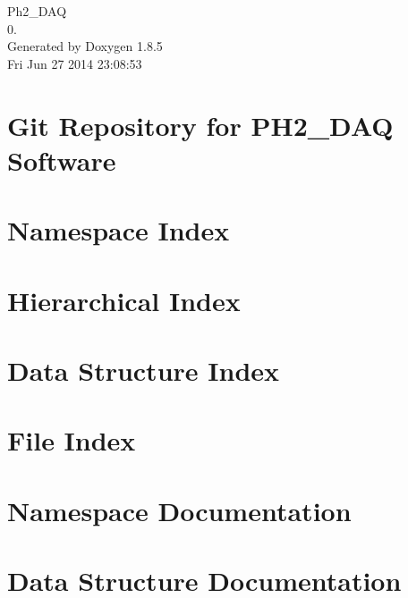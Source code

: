 \documentclass[twoside]{book}
\newcommand{\clearemptydoublepage}{%
  \newpage{\pagestyle{empty}\cleardoublepage}%
}
\begin{document}
\hypersetup{pageanchor=false}
\begin{titlepage}
\vspace*{7cm}
\begin{center}%
{\Large Ph2\-\_\-\-D\-A\-Q \\[1ex]\large 0. }\\
\vspace*{1cm}
{\large Generated by Doxygen 1.8.5}\\
\vspace*{0.5cm}
{\small Fri Jun 27 2014 23:08:53}\\
\end{center}
\end{titlepage}
\clearemptydoublepage
\tableofcontents
\clearemptydoublepage
{}
\hypersetup{pageanchor=true}

\chapter{Git Repository for P\-H2\-\_\-\-D\-A\-Q Software}
\label{md__r_e_a_d_m_e}
\hypertarget{md__r_e_a_d_m_e}{}

\chapter{Namespace Index}

\chapter{Hierarchical Index}

\chapter{Data Structure Index}

\chapter{File Index}

\chapter{Namespace Documentation}


\chapter{Data Structure Documentation}










\end{document}
